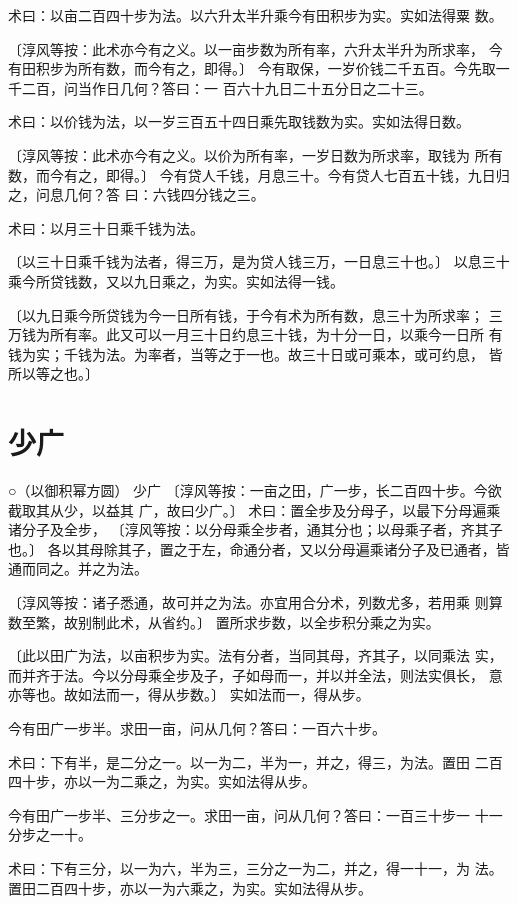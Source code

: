 \documentclass[12pt,UTF8]{ctexbook}
\begin{document}
术曰：以亩二百四十步为法。以六升太半升乘今有田积步为实。实如法得粟 数。

〔淳风等按：此术亦今有之义。以一亩步数为所有率，六升太半升为所求率， 今有田积步为所有数，而今有之，即得。〕 今有取保，一岁价钱二千五百。今先取一千二百，问当作日几何？答曰：一 百六十九日二十五分日之二十三。

术曰：以价钱为法，以一岁三百五十四日乘先取钱数为实。实如法得日数。

〔淳风等按：此术亦今有之义。以价为所有率，一岁日数为所求率，取钱为 所有数，而今有之，即得。〕 今有贷人千钱，月息三十。今有贷人七百五十钱，九日归之，问息几何？答 曰：六钱四分钱之三。

术曰：以月三十日乘千钱为法。

〔以三十日乘千钱为法者，得三万，是为贷人钱三万，一日息三十也。〕 以息三十乘今所贷钱数，又以九日乘之，为实。实如法得一钱。

〔以九日乘今所贷钱为今一日所有钱，于今有术为所有数，息三十为所求率； 三万钱为所有率。此又可以一月三十日约息三十钱，为十分一日，以乘今一日所 有钱为实；千钱为法。为率者，当等之于一也。故三十日或可乘本，或可约息， 皆所以等之也。〕 

\chapter{少广}

○（以御积幂方圆） 少广 〔淳风等按：一亩之田，广一步，长二百四十步。今欲截取其从少，以益其 广，故曰少广。〕 术曰：置全步及分母子，以最下分母遍乘诸分子及全步， 〔淳风等按：以分母乘全步者，通其分也；以母乘子者，齐其子也。〕 各以其母除其子，置之于左，命通分者，又以分母遍乘诸分子及已通者，皆 通而同之。并之为法。

〔淳风等按：诸子悉通，故可并之为法。亦宜用合分术，列数尤多，若用乘 则算数至繁，故别制此术，从省约。〕 置所求步数，以全步积分乘之为实。

〔此以田广为法，以亩积步为实。法有分者，当同其母，齐其子，以同乘法 实，而并齐于法。今以分母乘全步及子，子如母而一，并以并全法，则法实俱长， 意亦等也。故如法而一，得从步数。〕 实如法而一，得从步。

今有田广一步半。求田一亩，问从几何？答曰：一百六十步。

术曰：下有半，是二分之一。以一为二，半为一，并之，得三，为法。置田 二百四十步，亦以一为二乘之，为实。实如法得从步。

今有田广一步半、三分步之一。求田一亩，问从几何？答曰：一百三十步一 十一分步之一十。

术曰：下有三分，以一为六，半为三，三分之一为二，并之，得一十一，为 法。置田二百四十步，亦以一为六乘之，为实。实如法得从步。
\end{document}

